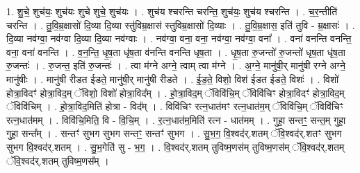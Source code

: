 \documentclass[17pt]{extarticle}
\begin{document}
1. शु॒चे॒ शुच॑यः॒ शुच॑यः शुचे शुचे॒ शुच॑यः । . शुच॑य श्चरन्ति चरन्ति॒ शुच॑यः॒ शुच॑य श्चरन्ति । . च॒र॒न्तीति॑ चरन्ति । . तु॒वि॒म्र॒क्षासो॑ दि॒व्या दि॒व्या स्तु॑विम्र॒क्षास॑ स्तुविम्र॒क्षासो॑ दि॒व्याः । . तु॒वि॒म्र॒क्षास॒ इति॑ तुवि - म्र॒क्षासः॑ । . दि॒व्या नव॑ग्वा॒ नव॑ग्वा दि॒व्या दि॒व्या नव॑ग्वाः । . नव॑ग्वा॒ वना॒ वना॒ नव॑ग्वा॒ नव॑ग्वा॒ वना᳚ । . वना॑ वनन्ति वनन्ति॒ वना॒ वना॑ वनन्ति । . व॒न॒न्ति॒ धृ॒ष॒ता धृ॑ष॒ता व॑नन्ति वनन्ति धृष॒ता । . धृ॒ष॒ता रु॒जन्तो॑ रु॒जन्तो॑ धृष॒ता धृ॑ष॒ता रु॒जन्तः॑ । . रु॒जन्त॒ इति॑ रु॒जन्तः॑ । . त्वा म॑ग्ने अग्ने॒ त्वाम् त्वा म॑ग्ने । . अ॒ग्ने॒ मानु॑षी॒र् मानु॑षी रग्ने अग्ने॒ मानु॑षीः । . मानु॑षी रीडत ईडते॒ मानु॑षी॒र् मानु॑षी रीडते । . ई॒ड॒ते॒ विशो॒ विश॑ ईडत ईडते॒ विशः॑ । . विशो॑ होत्रा॒विदꣳ॑ होत्रा॒विद॒म् ॅविशो॒ विशो॑ होत्रा॒विद᳚म् । . हो॒त्रा॒विद॒म् ॅविवि॑चि॒म् ॅविवि॑चिꣳ होत्रा॒विदꣳ॑ होत्रा॒विद॒म् ॅविवि॑चिम् । . हो॒त्रा॒विद॒मिति॑ होत्रा - विद᳚म् । . विवि॑चिꣳ रत्न॒धात॑मꣳ रत्न॒धात॑म॒म् ॅविवि॑चि॒म् ॅविवि॑चिꣳ रत्न॒धात॑मम् । . विवि॑चि॒मिति॒ वि - वि॒चि॒म् । . र॒त्न॒धात॑म॒मिति॑ रत्न - धात॑मम् । . गुहा॒ सन्तꣳ॒॒ सन्त॒म् गुहा॒ गुहा॒ सन्त᳚म् । . सन्तꣳ॑ सुभग सुभग सन्तꣳ॒॒ सन्तꣳ॑ सुभग । . सु॒भ॒ग॒ वि॒श्वद॑र्.शतम् ॅवि॒श्वद॑र्.शतꣳ सुभग सुभग वि॒श्वद॑र्.शतम् । . सु॒भ॒गेति॑ सु - भ॒ग॒ । . वि॒श्वद॑र्.शतम् तुविष्म॒णस॑म् तुविष्म॒णस॑म् ॅवि॒श्वद॑र्.शतम् ॅवि॒श्वद॑र्.शतम् तुविष्म॒णस᳚म् । \newline
\end{document}
